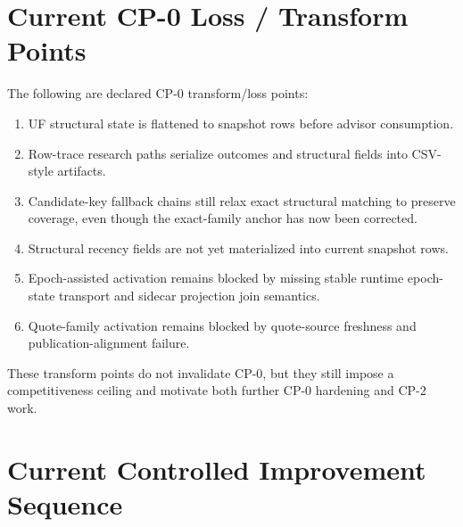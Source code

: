 \section{Current CP-0 Loss / Transform Points}

The following are declared CP-0 transform/loss points:
\begin{enumerate}[leftmargin=1.2cm]
    \item UF structural state is flattened to snapshot rows before advisor consumption.
    \item Row-trace research paths serialize outcomes and structural fields into CSV-style artifacts.
    \item Candidate-key fallback chains still relax exact structural matching to preserve coverage, even though the exact-family anchor has now been corrected.
    \item Structural recency fields are not yet materialized into current snapshot rows.
    \item Epoch-assisted activation remains blocked by missing stable runtime epoch-state transport and sidecar projection join semantics.
    \item Quote-family activation remains blocked by quote-source freshness and publication-alignment failure.
\end{enumerate}
These transform points do not invalidate CP-0, but they still impose a competitiveness ceiling and motivate both further CP-0 hardening and CP-2 work.

\section{Current Controlled Improvement Sequence}

